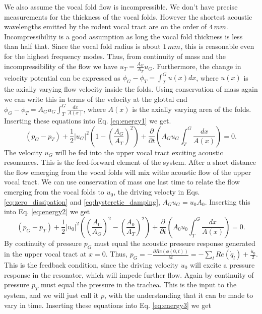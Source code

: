 \documentclass[superscriptaddress, onecolumn, prl]{revtex4}
\begin{document}
We also assume the vocal fold flow is incompressible. We don't have precise measurements for the thickness of the vocal folds. However the shortest acoustic wavelengths emitted by the rodent vocal tract are on the order of $4 \thinspace mm$. Incompressibility is a good assumption as long the vocal fold thickness is less than half that. Since the vocal fold radius is about $1 \thinspace mm$, this is reasonable even for the highest frequency modes. Thus, from continuity of mass and the incompressibility of the flow we have $u_{T}=\frac{A_{G}}{A_{T}}u_{G}$. Furthermore, the change in velocity potential can be expressed as $\phi_{G} - \phi_{T} = \int_{T}^{G} u(x) dx$, where $u(x)$ is the axially varying flow velocity inside the folds. Using conservation of mass again we can write this in terms of the velocity at the glottal end $\phi_{G} - \phi_{T} = A_{G} u_{G} \int_{T}^{G} \frac{dx}{A(x)}$, where $A(x)$ is the axially varying area of the folds. Inserting these equations into Eq. \ref{eq:energy1} we get.
\begin{equation}
\label{eq:energy2}
(p_{G} - p_{T}) + \frac{1}{2} |u_{G}|^2 \left(1 - \left( \frac{A_{G}}{A_{T}} \right)^2 \right) + \frac{\partial}{\partial t} \left( A_{G} u_{G} \int_{T}^{G} \frac{dx}{A(x)} \right) = 0.
\end{equation} 
The velocity $u_{G}$ will be fed into the upper vocal tract exciting acoustic resonances. This is the feed-forward element of the system. After a short distance the flow emerging from the vocal folds will mix withe acoustic flow of the upper vocal tract. We can use conservation of mass one last time to relate the flow emerging from the vocal folds to $u_0$, the driving velocty in Eqs. \ref{eq:zero_dissipation} and \ref{eq:hysteretic_damping}, $A_{G} u_{G} = u_0 A_0$. Inserting this into Eq. \ref{eq:energy2} we get 
\begin{equation}
\label{eq:energy3}
(p_{G} - p_{T}) + \frac{1}{2} |u_{0}|^2 \left( \left( \frac{A_{0}}{A_{G}} \right)^2- \left( \frac{A_{0}}{A_{T}} \right)^2 \right) + \frac{\partial}{\partial t} \left( A_{0} u_{0} \int_{T}^{G} \frac{dx}{A(x)} \right) = 0.
\end{equation} 
By continuity of pressure $p_{G}$ must equal the acoustic pressure response generated in the upper vocal tract at $x=0$. Thus, $p_{G}=-\frac{\partial Re(\phi(0,t))}{\partial t}=-\sum_l{Re(\dot{q}_l)} + \frac{\dot{u}_0}{2}$. This is the feedback condition, since the driving velocity $u_0$ will excite a pressure response in the resonator, which will impede further flow. Again by continuity of pressure $p_{T}$ must equal the pressure in the trachea. This is the input to the system, and we will just call it $p$, with the understanding that it can be made to vary in time. Inserting these equations into Eq. \ref{eq:energy3} we get 
\end{document}
